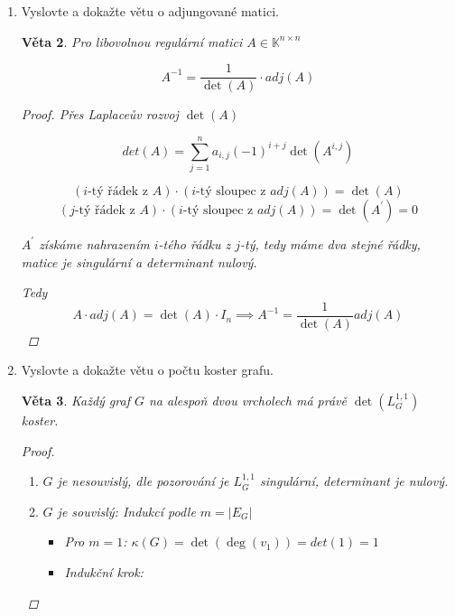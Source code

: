 \documentclass[10pt,a4paper]{article}
\theoremstyle{plain}
\newtheorem{veta}{Věta}
\begin{document}
\begin{enumerate}
\begin{veta}
\begin{proof}

Uvažme matici $I_{i \to x}$

\[A \cdot I_{i \to x} = A_{i \to b} \]
\[\implies \det(A) \det(I_{i \to x}) = \det(A_{i \to b}) \]
\[x_i = det(I_{i \to x}) \]
\[\implies x_i = \frac1{\det(A)}\det(A_{i \to b}) \]

\end{proof}
\end{veta}

\item Vyslovte a dokažte větu o adjungované matici.

\begin{veta}
Pro libovolnou regulární matici $A \in \mathbb{K}^{n \times n}$

\[ A^{-1} = \frac1{\det(A)}\cdot adj(A)\]

\begin{proof}

Přes Laplaceův rozvoj $\det(A)$

\[ det(A) = \sum^n_{j=1} a_{i,j} (-1)^{i+j} \det(A^{i,j})\]

\hfill

\[ (i\text{-tý řádek z }A)\cdot(i\text{-tý sloupec z }adj(A)) = \det(A) \]
\[ (j\text{-tý řádek z }A)\cdot(i\text{-tý sloupec z }adj(A)) = \det(A^\prime) = 0 \]

$A^\prime$ získáme nahrazením $i$-tého řádku z $j$-tý, tedy máme dva stejné řádky, matice je singulární a determinant nulový.

Tedy
\[ A \cdot adj(A) = \det(A) \cdot I_n \implies A^{-1} = \frac1{\det(A)} adj(A)\]


\end{proof}
\end{veta}

\item Vyslovte a dokažte větu o počtu koster grafu.


\begin{veta}
Každý graf $G$ na alespoň dvou vrcholech má právě $\det(L_G^{1,1})$ koster.
\begin{proof}

\begin{enumerate}[label=(\alph*)]
\item $G$ je nesouvislý, dle pozorování je $L_G^{1,1}$ singulární, determinant je nulový.
\item $G$ je souvislý: Indukcí podle $m = |E_G|$

\begin{itemize}
\item Pro $m = 1$: $\kappa(G) = \det(\deg(v_1)) = det(1) = 1$
\item Indukční krok:




\end{itemize}
\end{enumerate}
\end{proof}
\end{veta}
\end{enumerate}
\end{document}
